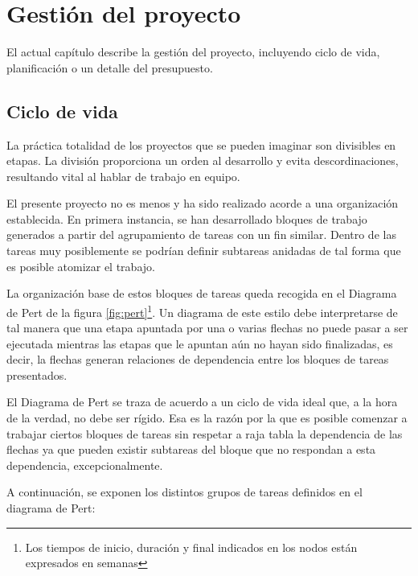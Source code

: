 \chapter{Gestión del proyecto}

El actual capítulo describe la gestión del proyecto, incluyendo ciclo de vida, planificación o un detalle del presupuesto.

\section{Ciclo de vida}

La práctica totalidad de los proyectos que se pueden imaginar son divisibles en etapas. La división proporciona un orden al desarrollo y evita descordinaciones, resultando vital al hablar de trabajo en equipo.

El presente proyecto no es menos y ha sido realizado acorde a una organización establecida. En primera instancia, se han desarrollado bloques de trabajo generados a partir del agrupamiento de tareas con un fin similar. Dentro de las tareas muy posiblemente se podrían definir subtareas anidadas de tal forma que es posible atomizar el trabajo.

La organización base de estos bloques de tareas queda recogida en el Diagrama de Pert de la figura \ref{fig:pert}\footnote{Los tiempos de inicio, duración y final indicados en los nodos están expresados en semanas}. Un diagrama de este estilo debe interpretarse de tal manera que una etapa apuntada por una o varias flechas no puede pasar a ser ejecutada mientras las etapas que le apuntan aún no hayan sido finalizadas, es decir, la flechas generan relaciones de dependencia entre los bloques de tareas presentados.

El Diagrama de Pert se traza de acuerdo a un ciclo de vida ideal que, a la hora de la verdad, no debe ser rígido. Esa es la razón por la que es posible comenzar a trabajar ciertos bloques de tareas sin respetar a raja tabla la dependencia de las flechas ya que pueden existir subtareas del bloque que no respondan a esta dependencia, excepcionalmente.

A continuación, se exponen los distintos grupos de tareas definidos en el diagrama de Pert:

